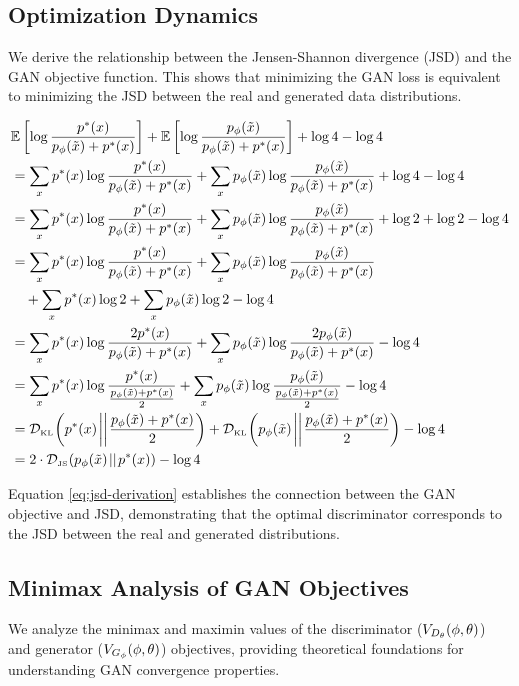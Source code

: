 \subsection{Optimization Dynamics}
\label{sec:proof-for-jsd-thing}
We derive the relationship between the Jensen-Shannon divergence (JSD) and the GAN objective function. This shows that minimizing the GAN loss is equivalent to minimizing the JSD between the real and generated data distributions.
\begin{small}
	\begin{align}
		 & \mathbb{E}\left[\log\frac{\ptx}{\pgx + \ptx}\right] + \mathbb{E}\left[\log\frac{\pgx}{\pgx + \ptx}\right] + \log 4 - \log 4 \nonumber \\
		 & = \sum_{x} \ptx \log\frac{\ptx}{\pgx + \ptx} + \sum_{x} \pgx \log\frac{\pgx}{\pgx + \ptx} + \log 4 - \log 4 \nonumber                 \\
		 & = \sum_{x} \ptx \log\frac{\ptx}{\pgx + \ptx} + \sum_{x} \pgx \log\frac{\pgx}{\pgx + \ptx} + \log 2 + \log 2 - \log 4 \nonumber        \\
		 & = \sum_{x} \ptx \log\frac{\ptx}{\pgx + \ptx} + \sum_{x} \pgx \log\frac{\pgx}{\pgx + \ptx} \nonumber                                   \\
		 & \quad + \sum_{x} \ptx \log 2 + \sum_{x} \pgx \log 2 - \log 4 \nonumber                                                                \\
		 & = \sum_{x} \ptx \log\frac{2 \ptx}{\pgx + \ptx} + \sum_{x} \pgx \log\frac{2 \pgx}{\pgx + \ptx} - \log 4 \nonumber                      \\
		 & = \sum_{x} \ptx \log\frac{\ptx}{\frac{\pgx + \ptx}{2}} + \sum_{x} \pgx \log\frac{\pgx}{\frac{\pgx + \ptx}{2}} - \log 4 \nonumber      \\
		 & = \KL{\ptx}{\frac{\pgx + \ptx}{2}} + \KL{\pgx}{\frac{\pgx + \ptx}{2}} - \log 4 \nonumber                                              \\
		 & = 2 \cdot \JSD{\pgx}{\ptx} - \log 4 \label{eq:jsd-derivation}
	\end{align}
\end{small}
Equation \ref{eq:jsd-derivation} establishes the connection between the GAN
objective and JSD, demonstrating that the optimal discriminator corresponds to
the JSD between the real and generated distributions.
\subsection{Minimax Analysis of GAN Objectives}
\label{sec:minimax-analysis}
We analyze the minimax and maximin values of the discriminator ($V_{D_\theta}(\phi, \theta)$) and generator ($V_{G_\phi}(\phi, \theta)$) objectives, providing theoretical foundations for understanding GAN convergence properties.
